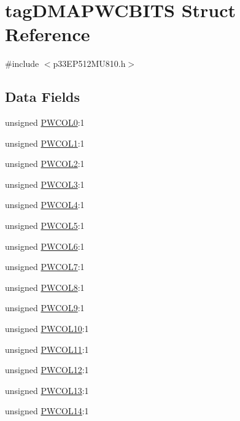 \hypertarget{structtag_d_m_a_p_w_c_b_i_t_s}{}\section{tag\+D\+M\+A\+P\+W\+C\+B\+I\+TS Struct Reference}
\label{structtag_d_m_a_p_w_c_b_i_t_s}


{\ttfamily \#include $<$p33\+E\+P512\+M\+U810.\+h$>$}

\subsection*{Data Fields}
\begin{DoxyCompactItemize}
\item 
unsigned \hyperlink{structtag_d_m_a_p_w_c_b_i_t_s_af2eedf93d406255064936c85bd44e1d4}{P\+W\+C\+O\+L0}\+:1
\item 
unsigned \hyperlink{structtag_d_m_a_p_w_c_b_i_t_s_a067baebd79d3492d5e8c27b7d87f3a02}{P\+W\+C\+O\+L1}\+:1
\item 
unsigned \hyperlink{structtag_d_m_a_p_w_c_b_i_t_s_a0c192b878ffd1ab1814ceb6f39da4231}{P\+W\+C\+O\+L2}\+:1
\item 
unsigned \hyperlink{structtag_d_m_a_p_w_c_b_i_t_s_a1398cc98e6b4f4bfc027849cb82f62a4}{P\+W\+C\+O\+L3}\+:1
\item 
unsigned \hyperlink{structtag_d_m_a_p_w_c_b_i_t_s_a01510bdf73738b5420e4a880872aca89}{P\+W\+C\+O\+L4}\+:1
\item 
unsigned \hyperlink{structtag_d_m_a_p_w_c_b_i_t_s_a9402759428ba9b40929191ad10d52488}{P\+W\+C\+O\+L5}\+:1
\item 
unsigned \hyperlink{structtag_d_m_a_p_w_c_b_i_t_s_acf56d3fe7dd0acef79f35808dd346918}{P\+W\+C\+O\+L6}\+:1
\item 
unsigned \hyperlink{structtag_d_m_a_p_w_c_b_i_t_s_a558beb1cc3954f17645555dadc49ff72}{P\+W\+C\+O\+L7}\+:1
\item 
unsigned \hyperlink{structtag_d_m_a_p_w_c_b_i_t_s_aae0a4381d052418f0dffda1a5ed5e47c}{P\+W\+C\+O\+L8}\+:1
\item 
unsigned \hyperlink{structtag_d_m_a_p_w_c_b_i_t_s_ace3b7aa4f1180e70accce990ca1a3458}{P\+W\+C\+O\+L9}\+:1
\item 
unsigned \hyperlink{structtag_d_m_a_p_w_c_b_i_t_s_a04853afb4a126fb0dd9a4d1e08d8cda8}{P\+W\+C\+O\+L10}\+:1
\item 
unsigned \hyperlink{structtag_d_m_a_p_w_c_b_i_t_s_aff7d602c9cb33367d654fad604ddae48}{P\+W\+C\+O\+L11}\+:1
\item 
unsigned \hyperlink{structtag_d_m_a_p_w_c_b_i_t_s_acf6bb8ffa5258d11c76d1ca7ace1464e}{P\+W\+C\+O\+L12}\+:1
\item 
unsigned \hyperlink{structtag_d_m_a_p_w_c_b_i_t_s_a7873b9af999b0d60d29ce9827d22d626}{P\+W\+C\+O\+L13}\+:1
\item 
unsigned \hyperlink{structtag_d_m_a_p_w_c_b_i_t_s_a8236aa5e798ce7c3bae1655f73789f74}{P\+W\+C\+O\+L14}\+:1
\end{DoxyCompactItemize}


